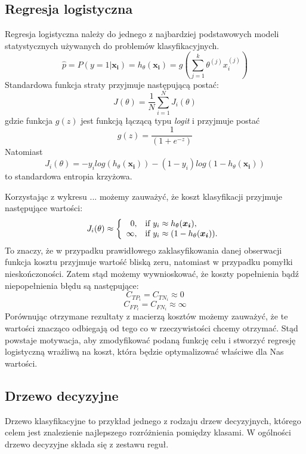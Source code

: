 \documentclass{book}
\begin{document}
\subsection{Regresja logistyczna}
\label{reg-log}
	Regresja logistyczna należy do jednego z najbardziej podstawowych modeli statystycznych używanych do problemów klasyfikacyjnych. 
	\begin{equation}
		\hat{p} = P(y=1|\boldsymbol{x_i}) = h_{\theta}(\boldsymbol{x_i}) = g\left(\sum_{j=1}^k \theta^{(j)}x_i^{(j)} \right)
	\end{equation} 
	Standardowa funkcja straty przyjmuje następującą postać:
	$$ J(\theta) = \frac{1}{N} \sum_{i=1}^N J_i(\theta) $$
	gdzie funkcja $g(z)$ jest funkcją łączącą typu \textit{logit} i przyjmuje postać 
	$$ g(z) = \frac{1}{(1+e^{-z})} $$
	Natomiast 
	\begin{equation}
	\label{c-e}
		J_i(\theta) = -y_i log(h_{\theta}(\boldsymbol{x_i})) - (1-y_i) log(1 - h_{\theta}(\boldsymbol{x_i}))
	\end{equation}
	$$  $$
	 to standardowa entropia krzyżowa.


    Korzystając z wykresu ... możemy zauważyć, że koszt klasyfikacji przyjmuje następujące wartości:
	$$
	J_i(\theta) \approx \left\{
	\begin{array}{rl}
	0, &\mbox{if $y_i \approx h_{\theta}(\boldsymbol{x_i})$}, \\
	\infty, &\mbox{if $y_i \approx (1 - h_{\theta}(\boldsymbol{x_i}))$}.
	\end{array}{}
	\right.
	$$
	To znaczy, że w przypadku prawidłowego zaklasyfikowania danej obserwacji funkcja kosztu przyjmuje wartość bliską zeru, natomiast w przypadku pomyłki nieskończoności. Zatem stąd możemy wywnioskować, że koszty popełnienia bądź niepopełnienia błędu są następujące:
	$$ C_{TP_i} = C_{TN_i} \approx 0 $$
	$$ C_{FP_i} = C_{FN_i} \approx \infty $$
	Porównując otrzymane rezultaty z macierzą kosztów możemy zauważyć, że te wartości znacząco odbiegają od tego co w rzeczywistości chcemy otrzymać. Stąd powstaje motywacja, aby zmodyfikować podaną funkcję celu i stworzyć regresję logistyczną wrażliwą na koszt, która będzie optymalizować właściwe dla Nas wartości.
\subsection{Drzewo decyzyjne}
\label{drzewo}

	Drzewo klasyfikacyjne to przykład jednego z rodzaju drzew decyzyjnych, którego celem jest znalezienie najlepszego rozróżnienia pomiędzy klasami. W ogólności drzewo decyzyjne składa się z zestawu reguł.
	
\end{document}
